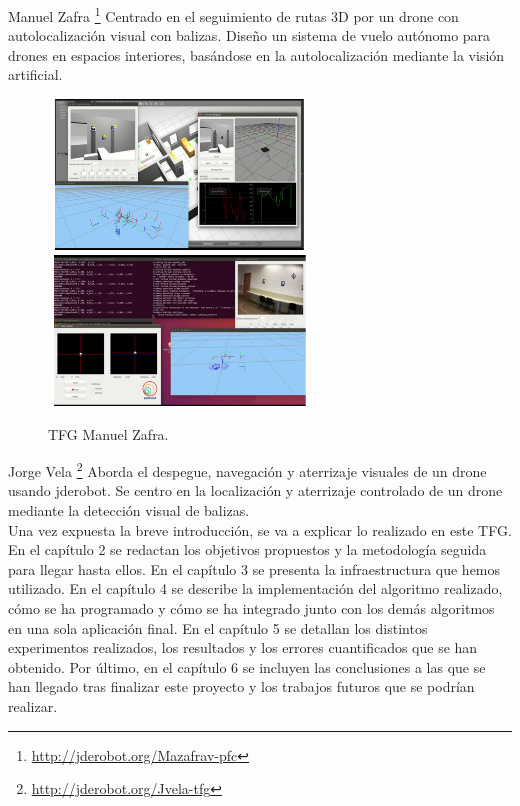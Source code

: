 \hspace{1cm} Manuel Zafra \footnote{\url{http://jderobot.org/Mazafrav-pfc}} \cite{ManuelZafra} Centrado en el seguimiento de rutas 3D por un drone con autolocalización
visual con balizas. Diseño un sistema de vuelo autónomo para drones en espacios interiores, basándose en la autolocalización mediante la visión artificial.

\begin{figure}[H]
 \centering
    \includegraphics[width=7cm,height=4cm]{imag/IMG9.png}
    \includegraphics[width=7cm,height=4cm]{imag/IMG10.png}
 \caption{TFG Manuel Zafra.}
 \label{f:TFG Manuel Zafra}
\end{figure} 

\hspace{1cm} Jorge Vela \footnote{\url{http://jderobot.org/Jvela-tfg}} \cite{JorgeVela} Aborda el despegue, navegación y aterrizaje visuales de un drone usando jderobot. Se centro en la localización y aterrizaje controlado de un drone mediante la detección visual de balizas.
\\

\hspace{1cm} Una vez expuesta la breve introducción, se va a explicar lo realizado en este TFG. En el capítulo 2 se redactan los objetivos propuestos y la metodología seguida para llegar hasta ellos. En el capítulo 3 se presenta la infraestructura que hemos utilizado. En el capítulo 4 se describe la implementación del algoritmo realizado, cómo se ha programado y cómo se ha integrado junto con los demás algoritmos en una sola aplicación final. En el capítulo 5 se detallan los distintos experimentos realizados, los resultados y los errores cuantificados que se han obtenido. Por último, en el capítulo 6 se incluyen las conclusiones a las que se han llegado tras finalizar este proyecto y los trabajos futuros que se podrían realizar.

